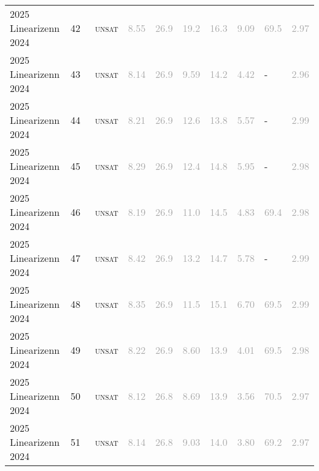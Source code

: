 \begin{center}
{\begin{longtable}{@{}llllllllll@{}}
2025 Linearizenn 2024 & 42 & ~\textsc{unsat} & \textcolor{darkgray}{8.55} & \textcolor{darkgray}{26.9} & \textcolor{darkgray}{19.2} & \textcolor{darkgray}{16.3} & \textcolor{darkgray}{9.09} & \textcolor{darkgray}{69.5} & \textcolor{darkgray}{2.97} \\
2025 Linearizenn 2024 & 43 & ~\textsc{unsat} & \textcolor{darkgray}{8.14} & \textcolor{darkgray}{26.9} & \textcolor{darkgray}{9.59} & \textcolor{darkgray}{14.2} & \textcolor{darkgray}{4.42} & - & \textcolor{darkgray}{2.96} \\
2025 Linearizenn 2024 & 44 & ~\textsc{unsat} & \textcolor{darkgray}{8.21} & \textcolor{darkgray}{26.9} & \textcolor{darkgray}{12.6} & \textcolor{darkgray}{13.8} & \textcolor{darkgray}{5.57} & - & \textcolor{darkgray}{2.99} \\
2025 Linearizenn 2024 & 45 & ~\textsc{unsat} & \textcolor{darkgray}{8.29} & \textcolor{darkgray}{26.9} & \textcolor{darkgray}{12.4} & \textcolor{darkgray}{14.8} & \textcolor{darkgray}{5.95} & - & \textcolor{darkgray}{2.98} \\
2025 Linearizenn 2024 & 46 & ~\textsc{unsat} & \textcolor{darkgray}{8.19} & \textcolor{darkgray}{26.9} & \textcolor{darkgray}{11.0} & \textcolor{darkgray}{14.5} & \textcolor{darkgray}{4.83} & \textcolor{darkgray}{69.4} & \textcolor{darkgray}{2.98} \\
2025 Linearizenn 2024 & 47 & ~\textsc{unsat} & \textcolor{darkgray}{8.42} & \textcolor{darkgray}{26.9} & \textcolor{darkgray}{13.2} & \textcolor{darkgray}{14.7} & \textcolor{darkgray}{5.78} & - & \textcolor{darkgray}{2.99} \\
2025 Linearizenn 2024 & 48 & ~\textsc{unsat} & \textcolor{darkgray}{8.35} & \textcolor{darkgray}{26.9} & \textcolor{darkgray}{11.5} & \textcolor{darkgray}{15.1} & \textcolor{darkgray}{6.70} & \textcolor{darkgray}{69.5} & \textcolor{darkgray}{2.99} \\
2025 Linearizenn 2024 & 49 & ~\textsc{unsat} & \textcolor{darkgray}{8.22} & \textcolor{darkgray}{26.9} & \textcolor{darkgray}{8.60} & \textcolor{darkgray}{13.9} & \textcolor{darkgray}{4.01} & \textcolor{darkgray}{69.5} & \textcolor{darkgray}{2.98} \\
2025 Linearizenn 2024 & 50 & ~\textsc{unsat} & \textcolor{darkgray}{8.12} & \textcolor{darkgray}{26.8} & \textcolor{darkgray}{8.69} & \textcolor{darkgray}{13.9} & \textcolor{darkgray}{3.56} & \textcolor{darkgray}{70.5} & \textcolor{darkgray}{2.97} \\
2025 Linearizenn 2024 & 51 & ~\textsc{unsat} & \textcolor{darkgray}{8.14} & \textcolor{darkgray}{26.8} & \textcolor{darkgray}{9.03} & \textcolor{darkgray}{14.0} & \textcolor{darkgray}{3.80} & \textcolor{darkgray}{69.2} & \textcolor{darkgray}{2.97} \\

\end{longtable}}
\end{center}
